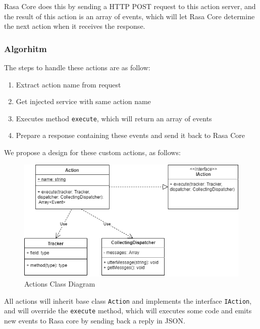 Rasa Core does this by sending a HTTP POST request to this action server, and the result of this action is an array of events, which will let Rasa Core determine the next action when it receives the response.

\subsubsection{Algorhitm}
The steps to handle these actions are as follow:
\begin{enumerate}
    \item Extract action name from request
    \item Get injected service with same action name
    \item Executes method \texttt{execute}, which will return an array of events
    \item Prepare a response containing these events and send it back to Rasa Core
\end{enumerate}

We propose a design for these custom actions, as follows:
\begin{figure}[!ht]
    \centering
    \includegraphics[scale=0.5]{Picture/architecture/Actions.png}
    \caption{Actions Class Diagram}
\end{figure}
All actions will inherit base class \texttt{Action} and implements the interface \texttt{IAction}, and will override the \texttt{execute} method, which will executes some code and emits new events to Rasa core by sending back a reply in JSON.
